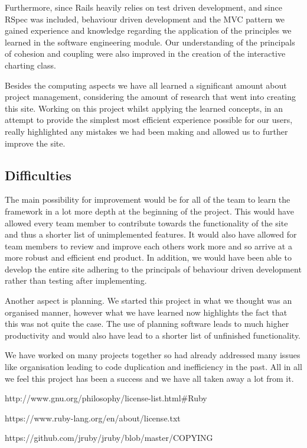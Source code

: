 \documentclass[a4wide, 11pt]{article}
\begin{document}
Furthermore, since Rails heavily relies on test driven development, and since RSpec was included, behaviour driven development and the MVC pattern we gained experience and knowledge regarding the application of the principles we learned in the software engineering module. Our understanding of the principals of cohesion and coupling were also improved in the creation of the interactive charting class.

Besides the computing aspects we have all learned a significant amount about project management, considering the amount of research that went into creating this site. Working on this project whilst applying the learned concepts, in an attempt to provide the simplest most efficient experience possible for our users, really highlighted any mistakes we had been making and allowed us to further improve the site.
\clearpage

\subsection{Difficulties}
The main possibility for improvement would be for all of the team to learn the framework in a lot more depth at the beginning of the project. This would have allowed every team member to contribute towards the functionality of the site and thus a shorter list of unimplemented features. It would also have allowed for team members to review and improve each others work more and so arrive at a more robust and efficient end product. In addition, we would have been able to develop the entire site adhering to the principals of behaviour driven development rather than testing after implementing.

Another aspect is planning. We started this project in what we thought was an organised manner, however what we have learned now highlights the fact that this was not quite the case. The use of planning software leads to much higher productivity and would also have lead to a shorter list of unfinished functionality. 

We have worked on many projects together so had already addressed many issues like organisation leading to code duplication and inefficiency in the past. All in all we feel this project has been a success and we have all taken away a lot from it.

\begin{thebibliography}{9}

  http://www.gnu.org/philosophy/license-list.html\#Ruby

  https://www.ruby-lang.org/en/about/license.txt

  https://github.com/jruby/jruby/blob/master/COPYING
\end{thebibliography}
\end{document}
